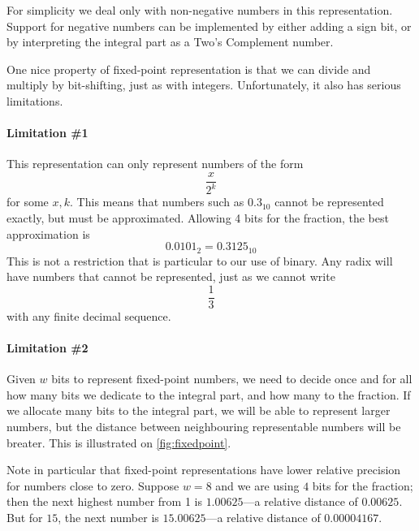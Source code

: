 For simplicity we deal only with non-negative numbers in this
representation.  Support for negative numbers can be implemented by
either adding a sign bit, or by interpreting the integral part as a
Two's Complement number.

One nice property of fixed-point representation is that we can divide
and multiply by bit-shifting, just as with integers.  Unfortunately,
it also has serious limitations.

\paragraph{Limitation \#1} This representation can only represent
numbers of the form
\[
  \frac{x}{2^{k}}
\]
for some $x,k$.  This means that numbers such as $0.3_{10}$ cannot be
represented exactly, but must be approximated.  Allowing 4 bits for
the fraction, the best approximation is
\begin{equation*}
  0.0101_{2} = 0.3125_{10}
\end{equation*}
This is not a restriction that is particular to our use of binary.
Any radix will have numbers that cannot be represented, just as we
cannot write
\[
  \frac{1}{3}
\]
with any finite decimal sequence.

\paragraph{Limitation \#2} Given $w$ bits to represent fixed-point
numbers, we need to decide once and for all how many bits we dedicate
to the integral part, and how many to the fraction.  If we allocate
many bits to the integral part, we will be able to represent larger
numbers, but the distance between neighbouring representable numbers
will be breater.  This is illustrated on \cref{fig:fixedpoint}.

Note in particular that fixed-point representations have lower
relative precision for numbers close to zero.  Suppose $w=8$ and we
are using $4$ bits for the fraction; then the next highest number from
1 is $1.00625$---a relative distance of $0.00625$.  But for $15$, the
next number is $15.00625$---a relative distance of $0.00004167$.

